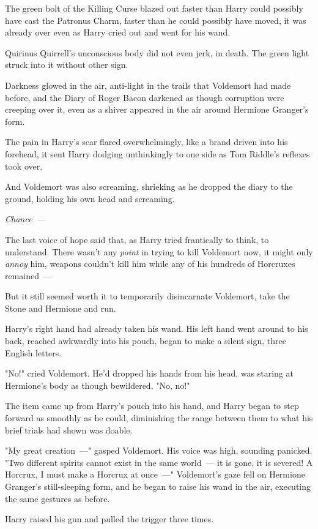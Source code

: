 The green bolt of the Killing Curse blazed out faster than Harry could possibly
have cast the Patronus Charm, faster than he could possibly have moved, it was
already over even as Harry cried out and went for his wand.

Quirinus Quirrell's unconscious body did not even jerk, in death. The green
light struck into it without other sign.

Darkness glowed in the air, anti-light in the trails that Voldemort had made
before, and the Diary of Roger Bacon darkened as though corruption were
creeping over it, even as a shiver appeared in the air around Hermione
Granger's form.

The pain in Harry's scar flared overwhelmingly, like a brand driven into his
forehead, it sent Harry dodging unthinkingly to one side as Tom Riddle's
reflexes took over.

And Voldemort was also screaming, shrieking as he dropped the diary to the
ground, holding his own head and screaming.

\emph{Chance~--- }

The last voice of hope said that, as Harry tried frantically to think, to
understand. There wasn't any \emph{point} in trying to kill Voldemort now, it
might only \emph{annoy} him, weapons couldn't kill him while any of his
hundreds of Horcruxes remained~---

But it still seemed worth it to temporarily disincarnate Voldemort, take the
Stone and Hermione and run.

Harry's right hand had already taken his wand. His left hand went around to his
back, reached awkwardly into his pouch, began to make a silent sign, three
English letters.

"No!" cried Voldemort. He'd dropped his hands from his head, was staring at
Hermione's body as though bewildered. "No, no!"

The item came up from Harry's pouch into his hand, and Harry began to step
forward as smoothly as he could, diminishing the range between them to what his
brief trials had shown was doable.

"My great creation~---" gasped Voldemort. His voice was high, sounding panicked.
"Two different spirits cannot exist in the same world~--- it is gone, it is
severed! A Horcrux, I must make a Horcrux at once~---" Voldemort's gaze fell on
Hermione Granger's still-sleeping form, and he began to raise his wand in the
air, executing the same gestures as before.

Harry raised his gun and pulled the trigger three times.
